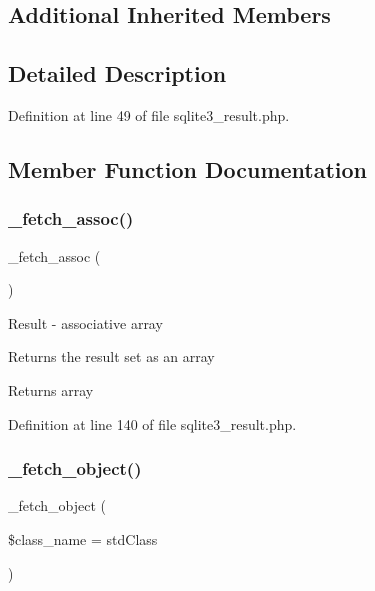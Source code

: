 \subsection*{Additional Inherited Members}


\subsection{Detailed Description}


Definition at line 49 of file sqlite3\+\_\+result.\+php.



\subsection{Member Function Documentation}
\mbox{\label{class_c_i___d_b__sqlite3__result_a43a9a92817f1334a1c10752ec44275a0}} 
\subsubsection{\texorpdfstring{\_fetch\_assoc()}{\_fetch\_assoc()}}
{\footnotesize\ttfamily \+\_\+fetch\+\_\+assoc (\begin{DoxyParamCaption}{ }\end{DoxyParamCaption})\hspace{0.3cm}{\ttfamily [protected]}}

Result -\/ associative array

Returns the result set as an array

\begin{DoxyReturn}{Returns}
array 
\end{DoxyReturn}


Definition at line 140 of file sqlite3\+\_\+result.\+php.

\mbox{\label{class_c_i___d_b__sqlite3__result_a60806be6a9c2488820813c2a7f4fef71}} 
\subsubsection{\texorpdfstring{\_fetch\_object()}{\_fetch\_object()}}
{\footnotesize\ttfamily \+\_\+fetch\+\_\+object (\begin{DoxyParamCaption}\item[{}]{\$class\+\_\+name = {\ttfamily \textquotesingle{}stdClass\textquotesingle{}} }\end{DoxyParamCaption})\hspace{0.3cm}{\ttfamily [protected]}}

